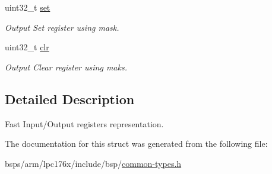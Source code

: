 \begin{DoxyCompactItemize}
uint32\+\_\+t \mbox{\hyperlink{structlpc176x__fio_a5c8a9e1e7eaeaa85db7a64fe9d461fd4}{set}}
\begin{DoxyCompactList}\small\item\em Output Set register using \textquotesingle{}mask\textquotesingle{}. \end{DoxyCompactList}\item 
\mbox{\label{structlpc176x__fio_aeef8b69210179403619c9d556544dffa}} 
uint32\+\_\+t \mbox{\hyperlink{structlpc176x__fio_aeef8b69210179403619c9d556544dffa}{clr}}
\begin{DoxyCompactList}\small\item\em Output Clear register using \textquotesingle{}maks\textquotesingle{}. \end{DoxyCompactList}\end{DoxyCompactItemize}


\subsection{Detailed Description}
Fast Input/\+Output registers representation. 

The documentation for this struct was generated from the following file\+:\begin{DoxyCompactItemize}
\item 
bsps/arm/lpc176x/include/bsp/\mbox{\hyperlink{common-types_8h}{common-\/types.\+h}}\end{DoxyCompactItemize}

